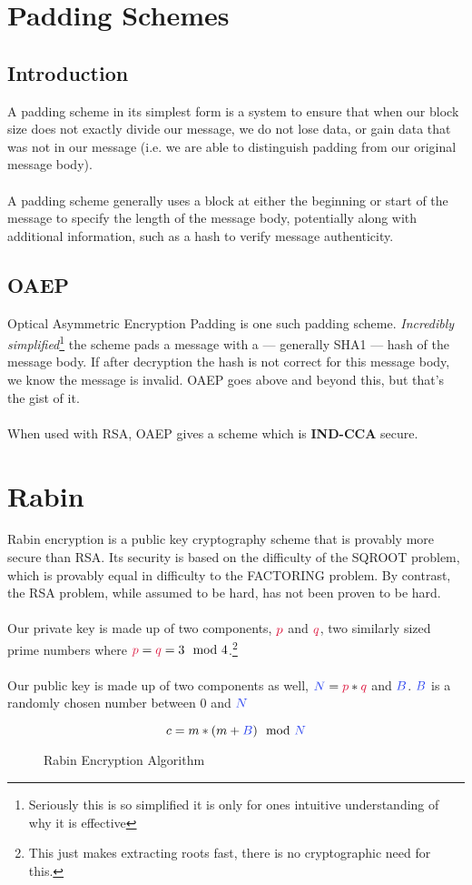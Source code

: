\section{Padding Schemes}

	\subsection{Introduction}
		A padding scheme in its simplest form is a system to ensure that when our block size does not exactly divide our message, we do not lose data, or gain data that was not in our message (i.e. we are able to distinguish padding from our original message body).\\
		\\
		A padding scheme generally uses a block at either the beginning or start of the message to specify the length of the message body, potentially along with additional information, such as a hash to verify message authenticity.

	\subsection{OAEP}
		Optical Asymmetric Encryption Padding is one such padding scheme. \textit{Incredibly simplified}\footnote{Seriously this is so simplified it is only for ones intuitive understanding of why it is effective} the scheme pads a message with a --- generally SHA1 --- hash of the message body. If after decryption the hash is not correct for this message body, we know the message is invalid. OAEP goes above and beyond this, but that's the gist of it.\\
		\\
		When used with RSA, OAEP gives a scheme which is \textbf{IND-CCA} secure.


\section{Rabin}
	Rabin encryption is a public key cryptography scheme that is provably more secure than RSA. Its security is based on the difficulty of the SQROOT problem, which is provably equal in difficulty to the FACTORING problem. By contrast, the RSA problem, while assumed to be hard, has not been proven to be hard.\\
	\\
	Our private key is made up of two components, $\textcolor{R}{p}$ and $\textcolor{R}{q}$, two similarly sized prime numbers where $\textcolor{R}{p} = \textcolor{R}{q} = 3 \mod 4$.\footnote{This just makes extracting roots fast, there is no cryptographic need for this.}\\
	\\
	Our public key is made up of two components as well, $\textcolor{B}{N} = \textcolor{R}{p}*\textcolor{R}{q}$ and $\textcolor{B}{B}$. $\textcolor{B}{B}$ is a randomly chosen number between $0$ and $\textcolor{B}{N}$\\
  \begin{figure}[htp!]
		$$c = m * (m + \textcolor{B}{B}) \mod \textcolor{B}{N}$$
  \caption{Rabin Encryption Algorithm}
  \label{fig:rabin-enc}
  \end{figure}

